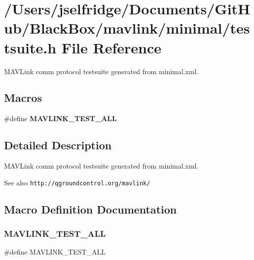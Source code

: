 \section{/\+Users/jselfridge/\+Documents/\+Git\+Hub/\+Black\+Box/mavlink/minimal/testsuite.h File Reference}
\label{minimal_2testsuite_8h}


M\+A\+V\+Link comm protocol testsuite generated from minimal.\+xml.  


\subsection*{Macros}
\begin{DoxyCompactItemize}
\item 
\#define \textbf{ M\+A\+V\+L\+I\+N\+K\+\_\+\+T\+E\+S\+T\+\_\+\+A\+LL}
\end{DoxyCompactItemize}


\subsection{Detailed Description}
M\+A\+V\+Link comm protocol testsuite generated from minimal.\+xml. 

\begin{DoxySeeAlso}{See also}
{\tt http\+://qgroundcontrol.\+org/mavlink/} 
\end{DoxySeeAlso}


\subsection{Macro Definition Documentation}
\mbox{\label{minimal_2testsuite_8h_ae706a993ca59ccc1a8a7c330f0b1ceec}} 
\subsubsection{M\+A\+V\+L\+I\+N\+K\+\_\+\+T\+E\+S\+T\+\_\+\+A\+LL}
{\footnotesize\ttfamily \#define M\+A\+V\+L\+I\+N\+K\+\_\+\+T\+E\+S\+T\+\_\+\+A\+LL}

